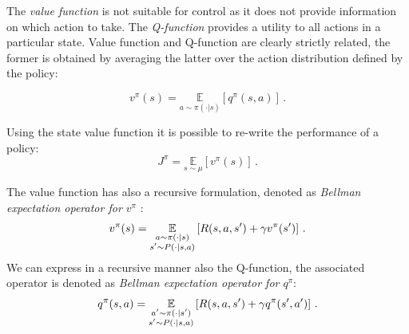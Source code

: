 The \textit{value function} is not suitable for control as it does not provide information on which action to take. The \textit{Q-function} provides a utility to all actions in a particular state.
 Value function and Q-function are clearly strictly related, the former is obtained by averaging the latter over the action distribution defined by the policy:

 \begin{equation}
v^\pi(s) = \underset{a \sim \pi(\cdot | s)}{\mathbb{E}} \left[ q^\pi(s,a) \right] \, .
\end{equation}

Using the state value function it is possible to re-write the performance of a policy:
\begin{equation}
J^\pi = \underset{s \sim \mu}{\mathbb{E}} \left[ v^\pi(s) \right] \, .
\end{equation}

The value function has also a recursive formulation, denoted as \textit{Bellman expectation operator for $v^\pi$} \citep{Bellman:1957}:
 \begin{equation}
v^\pi(s) = \underset{\begin{subarray}{c}
   a \sim \pi(\cdot | s) \\
   s'\sim P(\cdot | s,a)
   \end{subarray}}
   {\mathbb{E}} \left[R(s,a,s') + \gamma v^\pi (s') \right] \, .
\end{equation}
We can express in a recursive manner also the Q-function, the associated operator is denoted as \textit{Bellman expectation operator for $q^\pi$}:
 \begin{equation}
q^\pi(s,a) = \underset{\begin{subarray}{c}
   a' \sim \pi(\cdot | s') \\
   s' \sim P(\cdot | s,a)
   \end{subarray}}
   {\mathbb{E}} \left[R(s,a,s') + \gamma q^\pi(s',a')\right] \, .
\end{equation}

